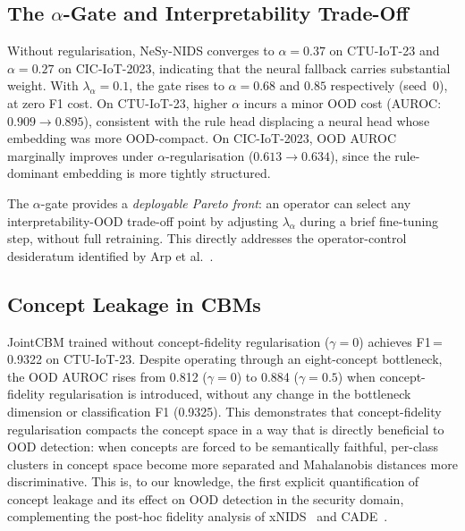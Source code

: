 \documentclass[conference]{IEEEtran}
\begin{document}
\subsection{The \texorpdfstring{$\alpha$}{alpha}-Gate and Interpretability Trade-Off}

Without regularisation, NeSy-NIDS converges to $\alpha{=}0.37$ on
CTU-IoT-23 and $\alpha{=}0.27$ on CIC-IoT-2023, indicating that the
neural fallback carries substantial weight. With $\lambda_\alpha{=}0.1$,
the gate rises to $\alpha{=}0.68$ and $0.85$ respectively (seed~0), at
zero F1 cost. On CTU-IoT-23, higher $\alpha$ incurs a minor OOD cost
(AUROC: $0.909\to0.895$), consistent with the rule head displacing a
neural head whose embedding was more OOD-compact. On CIC-IoT-2023, OOD
AUROC marginally improves under $\alpha$-regularisation
($0.613\to0.634$), since the rule-dominant embedding is more tightly
structured.

The $\alpha$-gate provides a \emph{deployable Pareto front}: an
operator can select any interpretability-OOD trade-off point by
adjusting $\lambda_\alpha$ during a brief fine-tuning step, without
full retraining. This directly addresses the operator-control
desideratum identified by Arp et al.~\cite{arp2022dos}.

\subsection{Concept Leakage in CBMs}
\label{sec:leakage}

JointCBM trained without concept-fidelity regularisation ($\gamma{=}0$)
achieves F1\,=\,0.9322 on CTU-IoT-23. Despite operating through an
eight-concept bottleneck, the OOD AUROC rises from 0.812 ($\gamma{=}0$)
to 0.884 ($\gamma{=}0.5$) when concept-fidelity regularisation is
introduced, without any change in the bottleneck dimension or
classification F1 (0.9325). This demonstrates that concept-fidelity
regularisation compacts the concept space in a way that is directly
beneficial to OOD detection: when concepts are forced to be semantically
faithful, per-class clusters in concept space become more separated and
Mahalanobis distances more discriminative. This is, to our knowledge,
the first explicit quantification of concept leakage and its effect on
OOD detection in the security domain, complementing the post-hoc
fidelity analysis of xNIDS~\cite{wei2023xnids} and
CADE~\cite{yang2021cade}.
\end{document}
